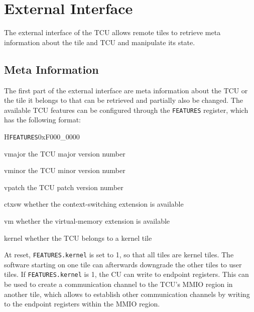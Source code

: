 \chapter{External Interface}

The external interface of the TCU allows remote tiles to retrieve meta information about the tile
and TCU and manipulate its state.

\section{Meta Information}

The first part of the external interface are meta information about the TCU or the tile it belongs
to that can be retrieved and partially also be changed. The available TCU features can be configured
through the \texttt{FEATURES} register, which has the following format:

\setlength{\regWidth}{.95\textwidth}
\begin{register}{H}{\texttt{FEATURES}}{0xF000\_0000}
  \regnewline%
  \begin{regdesc}\begin{reglist}
    \item[vmajor] the TCU major version number
    \item[vminor] the TCU minor version number
    \item[vpatch] the TCU patch version number
    \item[ctxsw] whether the context-switching extension is available
    \item[vm] whether the virtual-memory extension is available
    \item[kernel] whether the TCU belongs to a kernel tile
  \end{reglist}\end{regdesc}
\end{register}
\setlength{\regWidth}{\textwidth}

\noindent At reset, \texttt{FEATURES.kernel} is set to 1, so that all tiles are kernel tiles. The
software starting on one tile can afterwards downgrade the other tiles to user tiles. If
\texttt{FEATURES.kernel} is 1, the CU can write to endpoint registers. This can be used to create a
communication channel to the TCU's MMIO region in another tile, which allows to establish other
communication channels by writing to the endpoint registers within the MMIO region.

